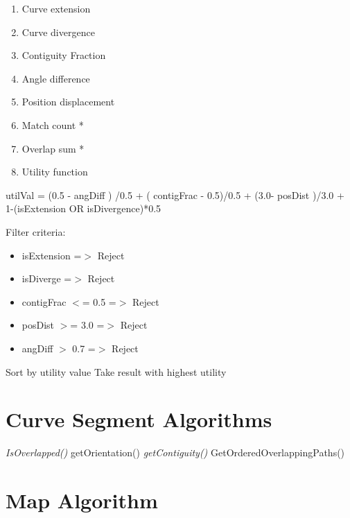 \begin{enumerate}
\item Curve extension

\item Curve divergence

\item Contiguity Fraction

\item Angle difference

\item Position displacement

\item Match count *

\item Overlap sum *

\item Utility function

\end{enumerate}

utilVal = (0.5 - angDiff ) \slash  0.5 + ( contigFrac - 0.5)\slash 0.5 + (3.0- posDist )\slash 3.0 + 1-(isExtension OR isDivergence)*0.5

Filter criteria:

\begin{itemize}
\item isExtension =$>$ Reject

\item isDiverge =$>$ Reject

\item contigFrac $<$= 0.5 =$>$ Reject

\item posDist $>$= 3.0 =$>$ Reject

\item angDiff $>$ 0.7 =$>$ Reject

\end{itemize}

Sort by utility value
Take result with highest utility

\section{Curve Segment Algorithms}
\label{curvesegmentalgorithms}

\emph{IsOverlapped()
}getOrientation()
\emph{getContiguity()
}GetOrderedOverlappingPaths()

\section{Map Algorithm}
\label{mapalgorithm}

